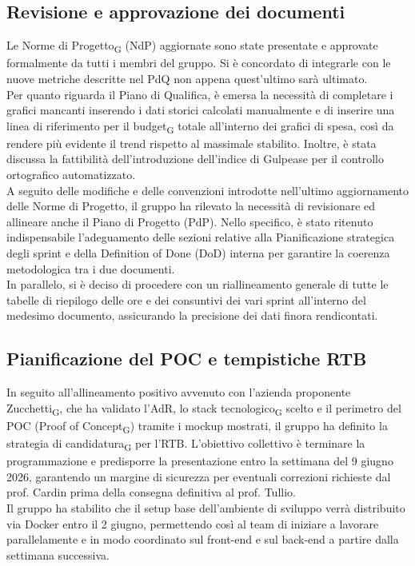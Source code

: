 \subsection{Revisione e approvazione dei documenti}
Le Norme di Progetto\textsubscript{G} (NdP) aggiornate sono state presentate e approvate formalmente da tutti i membri del gruppo. Si è concordato di integrarle con le nuove metriche descritte nel PdQ non appena quest'ultimo sarà ultimato. \\
Per quanto riguarda il Piano di Qualifica, è emersa la necessità di completare i grafici mancanti inserendo i dati storici calcolati manualmente e di inserire una linea di riferimento per il budget\textsubscript{G} totale all'interno dei grafici di spesa, così da rendere più evidente il trend rispetto al massimale stabilito. Inoltre, è stata discussa la fattibilità dell'introduzione dell'indice di Gulpease per il controllo ortografico automatizzato. \\
A seguito delle modifiche e delle convenzioni introdotte nell'ultimo aggiornamento delle Norme di Progetto, il gruppo ha rilevato la necessità di revisionare ed allineare anche il Piano di Progetto (PdP). Nello specifico, è stato ritenuto indispensabile l'adeguamento delle sezioni relative alla Pianificazione strategica degli sprint e della Definition of Done (DoD) interna per garantire la coerenza metodologica tra i due documenti. \\
In parallelo, si è deciso di procedere con un riallineamento generale di tutte le tabelle di riepilogo delle ore e dei consuntivi dei vari sprint all'interno del medesimo documento, assicurando la precisione dei dati finora rendicontati.

\subsection{Pianificazione del POC e tempistiche RTB}
In seguito all'allineamento positivo avvenuto con l'azienda proponente Zucchetti\textsubscript{G}, che ha validato l'AdR, lo stack tecnologico\textsubscript{G} scelto e il perimetro del POC (Proof of Concept\textsubscript{G}) tramite i mockup mostrati, il gruppo ha definito la strategia di candidatura\textsubscript{G} per l'RTB. L'obiettivo collettivo è terminare la programmazione e predisporre la presentazione entro la settimana del 9 giugno 2026, garantendo un margine di sicurezza per eventuali correzioni richieste dal prof. Cardin prima della consegna definitiva al prof. Tullio. \\
Il gruppo ha stabilito che il setup base dell'ambiente di sviluppo verrà distribuito via Docker entro il 2 giugno, permettendo così al team di iniziare a lavorare parallelamente e in modo coordinato sul front-end e sul back-end a partire dalla settimana successiva.

